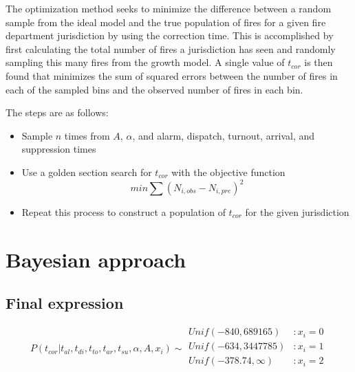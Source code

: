 \documentclass[letterpaper,11pt]{article}
\begin{document}
The optimization method seeks to minimize the difference between a random sample from the ideal model and the true population of fires for a given fire department jurisdiction by using the correction time. This is accomplished by first calculating the total number of fires a jurisdiction has seen and randomly sampling this many fires from the growth model. A single value of $t_{cor}$ is then found that minimizes the sum of squared errors between the number of fires in each of the sampled bins and the observed number of fires in each bin. 

The steps are as follows:
\begin{itemize}
  \item Sample $n$ times from $A$, $\alpha$, and alarm, dispatch, turnout, arrival, and suppression times
  \item Use a golden section search for $t_{cor}$ with the objective function 
  \begin{equation}    
    min{\sum (N_{i,obs}-N_{i,pre})^2}
  \end{equation}
  \item Repeat this process to construct a population of $t_{cor}$ for the given jurisdiction
\end{itemize}

\section{Bayesian approach}

\subsection{Final expression}

\[P(t_{cor} | t_{al},t_{di},t_{to},t_{ar},t_{su},\alpha,A,x_i) \sim
  \begin{array}{lr}
    Unif(-840,689165) & : x_i = 0 \\
    Unif(-634,3447785) & : x_i = 1 \\
    Unif(-378.74,\infty) & : x_i = 2 \\
  \end{array}
\]
\end{document}
